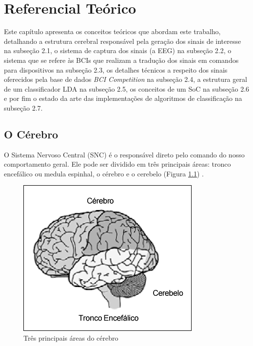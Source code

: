 
\chapter[Referencial Teórico]{Referencial Teórico}
Este capítulo apresenta os conceitos teóricos que abordam este trabalho, detalhando a estrutura cerebral responsável pela geração dos sinais de interesse na subseção 2.1, o sistema de captura dos sinais (a EEG) na subseção 2.2, o sistema que se refere às BCIs que realizam a tradução dos sinais em comandos para dispositivos na subseção 2.3, os detalhes técnicos a respeito dos sinais oferecidos pela base de dados \textit{BCI Competition} na subseção 2.4, a estrutura geral de um classificador LDA na subseção 2.5, os conceitos de um SoC na subseção 2.6 e por fim o estado da arte das implementações de algoritmos de classificação na subseção 2.7. 

\section{O Cérebro}
O Sistema Nervoso Central (SNC) é o responsável direto pelo comando do nosso comportamento geral\cite{David_Clarck}. Ele pode ser dividido em três principais áreas: tronco encefálico ou medula espinhal, o cérebro e o cerebelo (Figura \ref{BrainParts}) \cite{alvarezneurobiomecanismos}.

\begin{figure}[h]
	\centering
	\includegraphics[keepaspectratio=true,scale=1.0]{figuras/estrutura_cerebral.PNG}
	\caption{Três principais áreas do cérebro \cite{alvarezneurobiomecanismos}}
	\label{BrainParts}
\end{figure}

